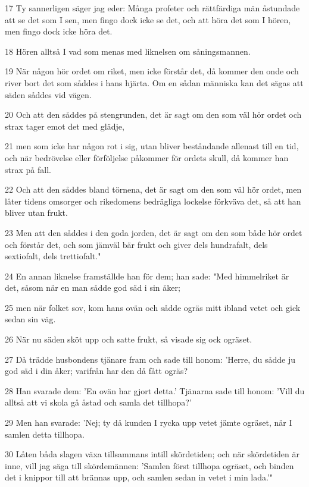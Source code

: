 \par 17 Ty sannerligen säger jag eder: Många profeter och rättfärdiga män åstundade att se det som I sen, men fingo dock icke se det, och att höra det som I hören, men fingo dock icke höra det.
\par 18 Hören alltså I vad som menas med liknelsen om såningsmannen.
\par 19 När någon hör ordet om riket, men icke förstår det, då kommer den onde och river bort det som såddes i hans hjärta. Om en sådan människa kan det sägas att säden såddes vid vägen.
\par 20 Och att den såddes på stengrunden, det är sagt om den som väl hör ordet och strax tager emot det med glädje,
\par 21 men som icke har någon rot i sig, utan bliver beståndande allenast till en tid, och när bedrövelse eller förföljelse påkommer för ordets skull, då kommer han strax på fall.
\par 22 Och att den såddes bland törnena, det är sagt om den som väl hör ordet, men låter tidens omsorger och rikedomens bedrägliga lockelse förkväva det, så att han bliver utan frukt.
\par 23 Men att den såddes i den goda jorden, det är sagt om den som både hör ordet och förstår det, och som jämväl bär frukt och giver dels hundrafalt, dels sextiofalt, dels trettiofalt."
\par 24 En annan liknelse framställde han för dem; han sade: "Med himmelriket är det, såsom när en man sådde god säd i sin åker;
\par 25 men när folket sov, kom hans ovän och sådde ogräs mitt ibland vetet och gick sedan sin väg.
\par 26 När nu säden sköt upp och satte frukt, så visade sig ock ogräset.
\par 27 Då trädde husbondens tjänare fram och sade till honom: 'Herre, du sådde ju god säd i din åker; varifrån har den då fått ogräs?
\par 28 Han svarade dem: 'En ovän har gjort detta.' Tjänarna sade till honom: 'Vill du alltså att vi skola gå åstad och samla det tillhopa?'
\par 29 Men han svarade: 'Nej; ty då kunden I rycka upp vetet jämte ogräset, när I samlen detta tillhopa.
\par 30 Låten båda slagen växa tillsammans intill skördetiden; och när skördetiden är inne, vill jag säga till skördemännen: 'Samlen först tillhopa ogräset, och binden det i knippor till att brännas upp, och samlen sedan in vetet i min lada.'"
